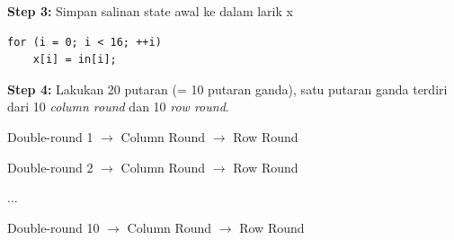 \documentclass{article}
\begin{document}

\textbf{Step 3:} Simpan salinan state awal ke dalam larik x

\begin{verbatim}
for (i = 0; i < 16; ++i)
    x[i] = in[i];
\end{verbatim}

\textbf{Step 4:} Lakukan 20 putaran (= 10 putaran ganda), satu putaran ganda terdiri dari 10 \textit{column round} dan 10 \textit{row round}.

Double-round 1
$\rightarrow$ Column Round
$\rightarrow$ Row Round

Double-round 2
$\rightarrow$ Column Round
$\rightarrow$ Row Round

$\dots$

Double-round 10
$\rightarrow$ Column Round
$\rightarrow$ Row Round
\end{document}
